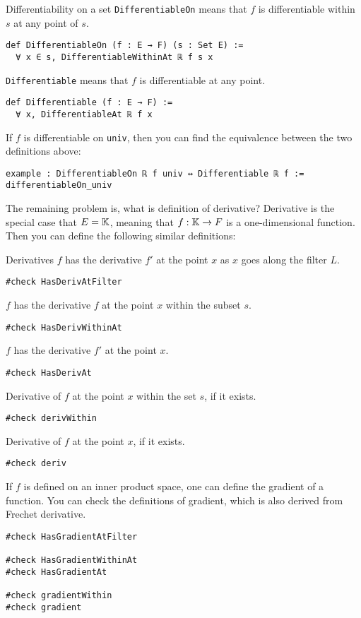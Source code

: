 \documentclass[a4paper]{article}
\begin{document}
\begin{dfn}{Differentiability on a set}
\texttt{DifferentiableOn} means that $f$ is differentiable within $s$ at any point of $s$.
\begin{lstlisting}[style=lean]
def DifferentiableOn (f : E → F) (s : Set E) :=
  ∀ x ∈ s, DifferentiableWithinAt ℝ f s x
\end{lstlisting}
\texttt{Differentiable} means that $f$ is differentiable at any point.
\begin{lstlisting}[style=lean]
def Differentiable (f : E → F) :=
  ∀ x, DifferentiableAt ℝ f x  
\end{lstlisting}
\end{dfn}

\begin{xmp}{}
If $f$ is differentiable on \texttt{univ}, then you can find the equivalence between the two definitions above:
\begin{lstlisting}[style = lean]
example : DifferentiableOn ℝ f univ ↔ Differentiable ℝ f := differentiableOn_univ
\end{lstlisting}
\end{xmp}

The remaining problem is, what is definition of derivative? Derivative is the special case that $E = \operatorname{\mathbb{K}}$, meaning that $f:\operatorname{\mathbb{K}} \to F$ is a one-dimensional function. Then you can define the following similar definitions:
\begin{dfn}{Derivatives}
$f$ has the derivative $f'$ at the point $x$ as $x$ goes along the filter $L$.
\begin{lstlisting}[style = lean]
#check HasDerivAtFilter
\end{lstlisting}
$f$ has the derivative $f$ at the point $x$ within the subset $s$.
\begin{lstlisting}[style = lean]
#check HasDerivWithinAt
\end{lstlisting}
$f$ has the derivative $f'$ at the point $x$.
\begin{lstlisting}[style = lean]
#check HasDerivAt
\end{lstlisting}
Derivative of $f$ at the point $x$ within the set $s$, if it exists.
\begin{lstlisting}[style = lean]
#check derivWithin
\end{lstlisting}
Derivative of $f$ at the point $x$, if it exists.
\begin{lstlisting}[style = lean]
#check deriv
\end{lstlisting}
\end{dfn}
If $f$ is defined on an inner product space, one can define the gradient of a function. You can check the definitions of gradient, which is also derived from Frechet derivative.
\begin{xmp}{}
\begin{lstlisting}[style = lean]
#check HasGradientAtFilter

#check HasGradientWithinAt
#check HasGradientAt

#check gradientWithin
#check gradient
\end{lstlisting}
\end{xmp}
\end{document}
